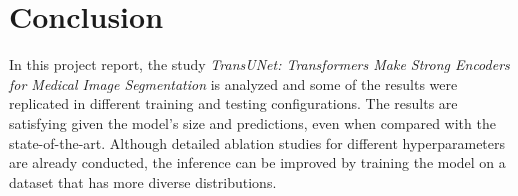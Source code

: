 \documentclass{IEEEtran}
\begin{document}
\section{Conclusion}

In this project report, the study \textit{TransUNet: Transformers Make Strong Encoders for Medical Image Segmentation} is analyzed and some of the results were replicated in different training and testing configurations. The results are satisfying given the model's size and predictions, even when compared with the state-of-the-art. Although detailed ablation studies for different hyperparameters are already conducted, the inference can be improved by training the model on a dataset that has more diverse distributions. 

\vfill\null\newpage
\printbibliography{}
\end{document}
